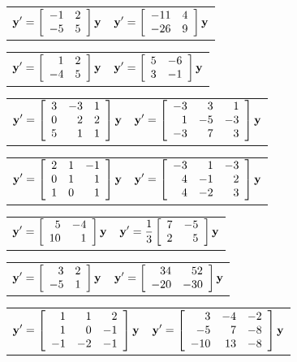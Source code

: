 \begin{exerciselist}
  \begin{tabular}[t]{@{}p{168pt}@{}p{168pt}}
    \item\label{exer:10.6.1} $\displaystyle{{\bf y}'=\left[\begin{array}{rr} -1&2\\-5&5\end{array}\right]{\bf y} }$ &
    \item\label{exer:10.6.2} $\displaystyle{{\bf y}'=\left[\begin{array}{rr} -11&4\\-26&9\end{array}\right]{\bf y} }$
  \end{tabular}

  \begin{tabular}[t]{@{}p{168pt}@{}p{168pt}}
    \item\label{exer:10.6.3} $\displaystyle{{\bf y}'=\left[\begin{array}{rr} 1&2\\-4&5\end{array}\right]{\bf y}}$ &
    \item\label{exer:10.6.4} $\displaystyle{{\bf y}'=\left[\begin{array}{rr} 5&-6\\3&-1\end{array}\right]{\bf y}}$
  \end{tabular}

  \begin{tabular}[t]{@{}p{168pt}@{}p{168pt}}
    \item\label{exer:10.6.5} $\displaystyle{{\bf y}'=\left[\begin{array}{rrr} 3&-3&1\\0&2&2\\5&1&1\end{array}\right]{\bf y}}$ &
    \item\label{exer:10.6.6} $\displaystyle{{\bf y}'=\left[\begin{array}{rrr} -3&3&1\\1&-5&-3\\-3&7&3\end{array}\right]{\bf y}}$
  \end{tabular}

  \begin{tabular}[t]{@{}p{168pt}@{}p{168pt}}
    \item\label{exer:10.6.7} $\displaystyle{{\bf y}'=\left[\begin{array}{rrr} 2&1&-1\\0&1&1\\1&0&1\end{array}\right]{\bf y}}$ &
    \item\label{exer:10.6.8} $\displaystyle{{\bf y}'=\left[\begin{array}{rrr} -3&1&-3\\4&-1&2\\4&-2&3\end{array}\right]{\bf y}}$
  \end{tabular}

  \begin{tabular}[t]{@{}p{168pt}@{}p{168pt}}
    \item\label{exer:10.6.9} $\displaystyle{{\bf y}'=\left[\begin{array}{rr} 5&-4\\10&1\end{array}\right]{\bf y}}$ &
    \item\label{exer:10.6.10} $\displaystyle{{\bf y}'=\frac{1}{3}\left[\begin{array}{rr} 7&-5\\2&5\end{array}\right]{\bf y}}$
  \end{tabular}

  \begin{tabular}[t]{@{}p{168pt}@{}p{168pt}}
    \item\label{exer:10.6.11} $\displaystyle{{\bf y}'=\left[\begin{array}{rr} 3&2\\-5&1\end{array}\right]{\bf y}}$ &
    \item\label{exer:10.6.12} $\displaystyle{{\bf y}'=\left[\begin{array}{rr} 34&52\\-20&-30\end{array}\right]{\bf y}}$
  \end{tabular}

  \begin{tabular}[t]{@{}p{168pt}@{}p{168pt}}
    \item\label{exer:10.6.13} $\displaystyle{{\bf y}' =\left[\begin{array}{rrr} 1&1&2\\1&0&-1\\-1&-2&-1\end{array}\right]{\bf y}}$ &
    \item\label{exer:10.6.14} $\displaystyle{{\bf y}' =\left[\begin{array}{rrr} 3&-4&-2\\-5&7&-8\\-10&13&-8\end{array}\right]{\bf y}}$
  \end{tabular}


\end{exerciselist}
